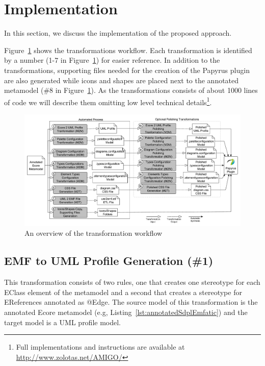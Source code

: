 \section{Implementation}
\label{sec:implementation}
In this section, we discuss the implementation of the proposed approach. 

Figure~\ref{fig:transformationWorkflow} shows the transformations workflow. Each transformation is identified by a number (1-7 in Figure~\ref{fig:transformationWorkflow}) for easier reference. 
In addition to the transformations, supporting files needed for the creation of the Papyrus plugin are also generated while icons and shapes are placed next to the annotated metamodel (\#8 in Figure~\ref{fig:transformationWorkflow}). 
As the transformations consists of about 1000 lines of code we will describe them omitting low level technical details\footnote{Full implementations and instructions are available at \url{http://www.zolotas.net/AMIGO/}}. 

\begin{figure}[t]
	\centering
	\includegraphics[width=1	\textwidth]{diagrams/transformationWorkflow.pdf}
	\caption[]{An overview of the transformation workflow}
	\label{fig:transformationWorkflow}
	\vspace*{-3mm}
\end{figure}

\subsection{EMF to UML Profile Generation (\#1)}
\label{sec:profileGeneration}
This transformation consists of two rules, one that creates one stereotype for each EClass element of the metamodel and a second that creates a stereotype for EReferences annotated as @Edge. 
The source model of this transformation is the annotated Ecore metamodel (e.g,  Listing~\ref{lst:annotatedSdplEmfatic}) and the target model is a UML profile model.

